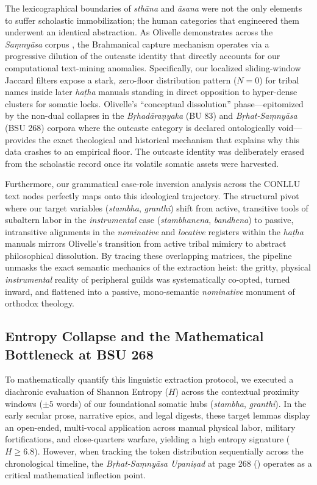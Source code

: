 \documentclass[11pt,twoside,letterpaper]{article}
\begin{document}
The lexicographical boundaries of \textit{sthāna} and \textit{āsana} were not the only elements to suffer scholastic immobilization; the human categories that engineered them underwent an identical abstraction. As Olivelle demonstrates across the \textit{Saṃnyāsa} corpus \cite{olivelle1992}, the Brahmanical capture mechanism operates via a progressive dilution of the outcaste identity that directly accounts for our computational text-mining anomalies. Specifically, our localized sliding-window Jaccard filters expose a stark, zero-floor distribution pattern ($N = 0$) for tribal names inside later \textit{haṭha} manuals standing in direct opposition to hyper-dense clusters for somatic locks. Olivelle's ``conceptual dissolution'' phase—epitomized by the non-dual collapses in the \textit{Bṛhadāraṇyaka} (BU 83) and \textit{Bṛhat-Saṃnyāsa} (BSU 268) corpora where the outcaste category is declared ontologically void—provides the exact theological and historical mechanism that explains why this data crashes to an empirical floor. The outcaste identity was deliberately erased from the scholastic record once its volatile somatic assets were harvested.

Furthermore, our grammatical case-role inversion analysis across the CONLLU text nodes perfectly maps onto this ideological trajectory. The structural pivot where our target variables (\textit{stambha}, \textit{granthi}) shift from active, transitive tools of subaltern labor in the \textit{instrumental} case (\textit{stambhanena}, \textit{bandhena}) to passive, intransitive alignments in the \textit{nominative} and \textit{locative} registers within the \textit{haṭha} manuals mirrors Olivelle's transition from active tribal mimicry to abstract philosophical dissolution. By tracing these overlapping matrices, the pipeline unmasks the exact semantic mechanics of the extraction heist: the gritty, physical \textit{instrumental} reality of peripheral guilds was systematically co-opted, turned inward, and flattened into a passive, mono-semantic \textit{nominative} monument of orthodox theology.

\subsection{Entropy Collapse and the Mathematical Bottleneck at BSU 268}
To mathematically quantify this linguistic extraction protocol, we executed a diachronic evaluation of Shannon Entropy ($H$) across the contextual proximity windows ($\pm 5$ words) of our foundational somatic hubs (\textit{stambha}, \textit{granthi}). In the early secular prose, narrative epics, and legal digests, these target lemmas display an open-ended, multi-vocal application across manual physical labor, military fortifications, and close-quarters warfare, yielding a high entropy signature ($H \ge 6.8$). However, when tracking the token distribution sequentially across the chronological timeline, the \textit{Bṛhat-Saṃnyāsa Upaniṣad} at page 268 (\cite{olivelle1992}) operates as a critical mathematical inflection point.
\end{document}

